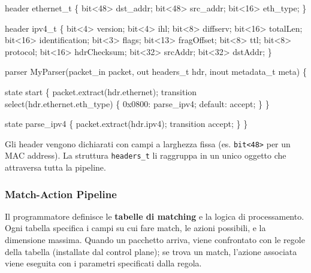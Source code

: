 \documentclass[
  italian,
  openany]{book}
\newenvironment{Shaded}{\begin{snugshade}}{\end{snugshade}}
\newcommand{\NormalTok}[1]{#1}
\begin{document}
\begin{Shaded}
\begin{Highlighting}[]
\NormalTok{header ethernet\_t \{}
\NormalTok{    bit\textless{}48\textgreater{} dst\_addr;}
\NormalTok{    bit\textless{}48\textgreater{} src\_addr;}
\NormalTok{    bit\textless{}16\textgreater{} eth\_type;}
\NormalTok{\}}

\NormalTok{header ipv4\_t \{}
\NormalTok{    bit\textless{}4\textgreater{}  version;}
\NormalTok{    bit\textless{}4\textgreater{}  ihl;}
\NormalTok{    bit\textless{}8\textgreater{}  diffserv;}
\NormalTok{    bit\textless{}16\textgreater{} totalLen;}
\NormalTok{    bit\textless{}16\textgreater{} identification;}
\NormalTok{    bit\textless{}3\textgreater{}  flags;}
\NormalTok{    bit\textless{}13\textgreater{} fragOffset;}
\NormalTok{    bit\textless{}8\textgreater{}  ttl;}
\NormalTok{    bit\textless{}8\textgreater{}  protocol;}
\NormalTok{    bit\textless{}16\textgreater{} hdrChecksum;}
\NormalTok{    bit\textless{}32\textgreater{} srcAddr;}
\NormalTok{    bit\textless{}32\textgreater{} dstAddr;}
\NormalTok{\}}

\NormalTok{parser MyParser(packet\_in packet,}
\NormalTok{                out headers\_t hdr,}
\NormalTok{                inout metadata\_t meta) \{}

\NormalTok{    state start \{}
\NormalTok{        packet.extract(hdr.ethernet);}
\NormalTok{        transition select(hdr.ethernet.eth\_type) \{}
\NormalTok{            0x0800: parse\_ipv4;}
\NormalTok{            default: accept;}
\NormalTok{        \}}
\NormalTok{    \}}

\NormalTok{    state parse\_ipv4 \{}
\NormalTok{        packet.extract(hdr.ipv4);}
\NormalTok{        transition accept;}
\NormalTok{    \}}
\NormalTok{\}}
\end{Highlighting}
\end{Shaded}

Gli header vengono dichiarati con campi a larghezza fissa (es.
\texttt{bit\textless{}48\textgreater{}} per un MAC address). La
struttura \texttt{headers\_t} li raggruppa in un unico oggetto che
attraversa tutta la pipeline.

\subsubsection{Match-Action Pipeline}\label{match-action-pipeline}

Il programmatore definisce le \textbf{tabelle di matching} e la logica
di processamento. Ogni tabella specifica i campi su cui fare match, le
azioni possibili, e la dimensione massima. Quando un pacchetto arriva,
viene confrontato con le regole della tabella (installate dal control
plane); se trova un match, l'azione associata viene eseguita con i
parametri specificati dalla regola.
\end{document}

